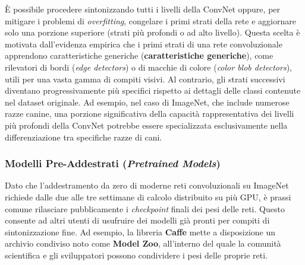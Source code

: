 ﻿\documentclass[11pt, a4paper]{article}
\begin{document}
È possibile procedere sintonizzando tutti i livelli della ConvNet oppure, per mitigare i problemi di \emph{overfitting}, congelare i primi strati della rete e aggiornare solo una porzione superiore (strati più profondi o ad alto livello). Questa scelta è motivata dall'evidenza empirica che i primi strati di una rete convoluzionale apprendono caratteristiche generiche (\textbf{caratteristiche generiche}), come rilevatori di bordi (\emph{edge detectors}) o di macchie di colore (\emph{color blob detectors}), utili per una vasta gamma di compiti visivi. Al contrario, gli strati successivi diventano progressivamente più specifici rispetto ai dettagli delle classi contenute nel dataset originale. Ad esempio, nel caso di ImageNet, che include numerose razze canine, una porzione significativa della capacità rappresentativa dei livelli più profondi della ConvNet potrebbe essere specializzata esclusivamente nella differenziazione tra specifiche razze di cani.


\subsubsection{Modelli Pre-Addestrati (\emph{Pretrained Models})}
Dato che l'addestramento da zero di moderne reti convoluzionali su ImageNet richiede dalle due alle tre settimane di calcolo distribuito su più GPU, è prassi comune rilasciare pubblicamente i \emph{checkpoint} finali dei pesi delle reti. Questo consente ad altri utenti di usufruire dei modelli già pronti per compiti di sintonizzazione fine. Ad esempio, la libreria \textbf{Caffe} mette a disposizione un archivio condiviso noto come \textbf{Model Zoo}, all'interno del quale la comunità scientifica e gli sviluppatori possono condividere i pesi delle proprie reti.


\newpage
\end{document}
